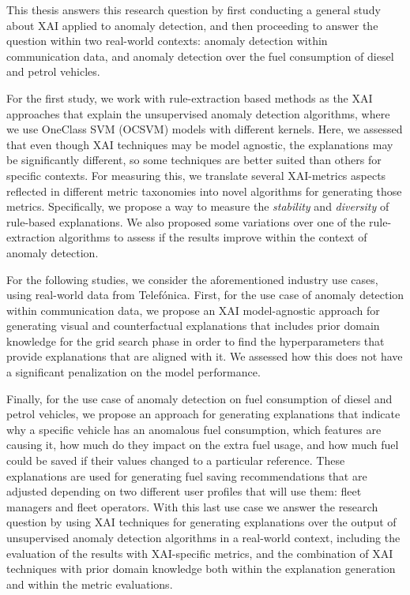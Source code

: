 This thesis answers this research question by first conducting a general study about XAI applied to anomaly detection, and then proceeding to answer the question within two real-world contexts: anomaly detection within communication data, and anomaly detection over the fuel consumption of diesel and petrol vehicles. 

For the first study, we work with rule-extraction based methods as the XAI approaches that explain the unsupervised anomaly detection algorithms, where we use OneClass SVM (OCSVM) models with different kernels. Here, we assessed that even though XAI techniques may be model agnostic, the explanations may be significantly different, so some techniques are better suited than others for specific contexts. For measuring this, we translate several XAI-metrics aspects reflected in different metric taxonomies into novel algorithms for generating those metrics. Specifically, we propose a way to measure the \textit{stability} and \textit{diversity} of rule-based explanations. We also proposed some variations over one of the rule-extraction algorithms to assess if the results improve within the context of anomaly detection.

For the following studies, we consider the aforementioned industry use cases, using real-world data from Telefónica. First, for the use case of anomaly detection within communication data, we propose an XAI model-agnostic approach for generating visual and counterfactual explanations that includes prior domain knowledge for the grid search phase in order to find the hyperparameters that provide explanations that are aligned with it. We assessed how this does not have a significant penalization on the model performance.

Finally, for the use case of anomaly detection on fuel consumption of diesel and petrol vehicles, we propose an approach for generating explanations that indicate why a specific vehicle has an anomalous fuel consumption, which features are causing it, how much do they impact on the extra fuel usage, and how much fuel could be saved if their values changed to a particular reference. These explanations are used for generating fuel saving recommendations that are adjusted depending on two different user profiles that will use them: fleet managers and fleet operators. With this last use case we answer the research question by using XAI techniques for generating explanations over the output of unsupervised anomaly detection algorithms in a real-world context, including the evaluation of the results with XAI-specific metrics, and the combination of XAI techniques with prior domain knowledge both within the explanation generation and within the metric evaluations.

